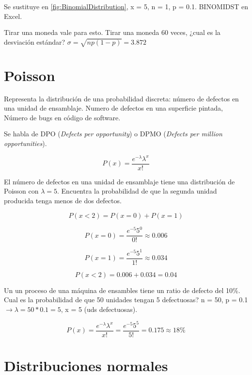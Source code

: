 \documentclass[oneside]{book}
\begin{document}
Se sustituye en \ref{fig:BinomialDistribution}, x = 5, n = 1, p = 0.1. BINOMIDST en Excel.

Tirar una moneda vale para esto. Tirar una moneda 60 veces, ¿cual es la desviación estándar? $\sigma = \sqrt{np(1-p)} = 3.872$ 

\section{Poisson}

Representa la distribución de una probabilidad discreta: número de defectos en una unidad de ensamblaje. Numero de defectos en una superficie pintada, Número de bugs en código de software.

Se habla de DPO (\textit{Defects per opportunity}) o DPMO (\textit{Defects per million opportunities}).

\begin{equation}
P(x)= \frac{e^{-\lambda}\lambda^x}{x!}
\end{equation}

El número de defectos en una unidad de ensamblaje tiene una distribución de Poisson con $\lambda = 5$. Encuentra la probabilidad de que la segunda unidad producida  tenga menos de dos defectos.

\begin{equation}
P(x < 2) = P(x=0)+P(x=1)
\end{equation}

\begin{equation}
P(x = 0) = \frac{e^{-5}5^0}{0!} \approx 0.006
\end{equation}

\begin{equation}
P(x = 1) = \frac{e^{-5}5^1}{1!} \approx 0.034
\end{equation}

\begin{equation}
P(x < 2) = 0.006 + 0.034 = 0.04
\end{equation}

Un un proceso de una máquina de ensambles tiene un ratio de defecto del 10\%. Cual es la probabilidad de que 50 unidades tengan 5 defectuosas? n = 50, p = 0.1 $\longrightarrow \lambda = 50*0.1 = 5$, x = 5 (uds defectuosas).

\begin{equation}
P(x) = \frac{e^{-\lambda}\lambda^x}{x!} = \frac{e^{-5}5^5}{5!} = 0.175 \approx 18\%
\end{equation} 

\section{Distribuciones normales}
\end{document}
